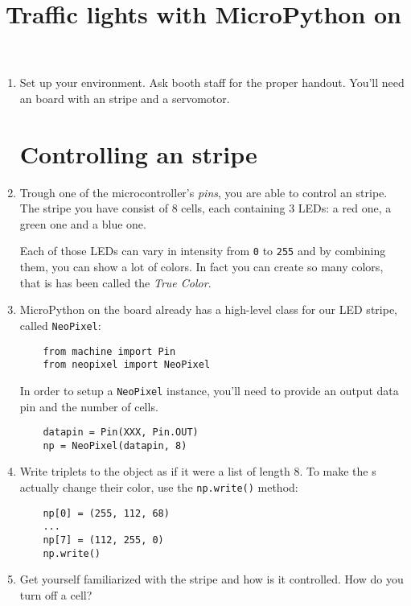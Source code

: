 \documentclass{../tutorial}
\title{Traffic lights with MicroPython on \abbr{ESP32}}
\begin{document}
\begin{enumerate}

\item
    Set up your environment. Ask booth staff for the proper handout.
    You'll need an  board with an   stripe and a servomotor.

\section{Controlling an   stripe}

\item
    Trough one of the microcontroller's \emph{pins},
    you are able to control an   stripe.
    The   stripe you have consist of 8 cells,
    each containing 3 LEDs: a red one, a green one and a blue one.

    Each of those LEDs can vary in intensity from \lstinline|0| to \lstinline|255|
    and by combining them, you can show a lot of colors.
    In fact you can create so many colors,
    that is has been called the \emph{True Color}.

\item
    MicroPython on the  board already has a high-level class for
    our LED stripe, called \lstinline|NeoPixel|:

    \begin{lstlisting}
    from machine import Pin
    from neopixel import NeoPixel
    \end{lstlisting}

    In order to setup a \lstinline|NeoPixel| instance,
    you'll need to provide an output data pin and the number of cells.

    \begin{lstlisting}
    datapin = Pin(XXX, Pin.OUT)
    np = NeoPixel(datapin, 8)
    \end{lstlisting}

\item
    Write  triplets to the object as if it were a list of length 8.
    To make the s actually change their color,
    use the \lstinline|np.write()| method:

    \begin{lstlisting}
    np[0] = (255, 112, 68)
    ...
    np[7] = (112, 255, 0)
    np.write()
    \end{lstlisting}

\item
    Get yourself familiarized with the stripe and how is it controlled.
    How do you turn off a cell?


\end{enumerate}
\end{document}

